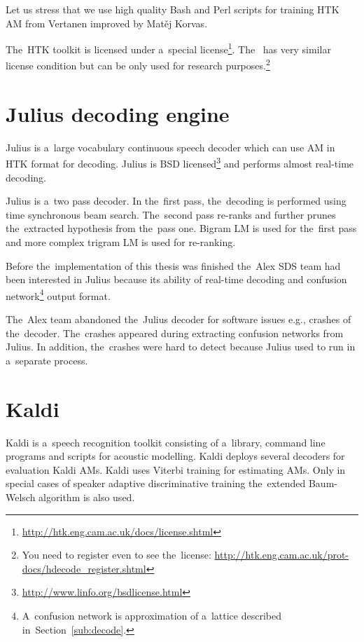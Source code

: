 Let us stress that we use high quality Bash and Perl scripts for training \ac{HTK} \ac{AM} from Vertanen improved by Matěj Korvas.\cite{vertanen_baseline_2006}\cite{korvas_2014}

The~\ac{HTK} toolkit is licensed under a~special license\footnote{\url{http://htk.eng.cam.ac.uk/docs/license.shtml}}.
The~ has very similar license condition but can be only used for research purposes.\footnote{You need to register even to see the~license: \url{http://htk.eng.cam.ac.uk/prot-docs/hdecode_register.shtml}}

\section{Julius decoding engine}
\label{sec:back_julius}

Julius is a~large vocabulary continuous speech decoder which can use \ac{AM} in \ac{HTK} format for decoding.\cite{lee2009julius}
Julius is BSD licensed\footnote{\url{http://www.linfo.org/bsdlicense.html}} and performs almost real-time decoding.

Julius is a~two pass decoder. 
In the~first pass, the~decoding is performed using time synchronous beam search.
The~second pass re-ranks and further prunes the~extracted hypothesis from the~pass one.
Bigram \ac{LM} is used for the~first pass and more complex trigram \ac{LM} is used for re-ranking.

Before the~implementation of this thesis was finished the~Alex \ac{SDS} team had been interested in Julius because its ability of real-time decoding and confusion network\footnote{A~confusion network is approximation of a~lattice described in~Section~\ref{sub:decode}.} output format.

The~Alex team abandoned the~Julius decoder for software issues e.g., crashes of the~decoder. 
The~crashes appeared during extracting confusion networks from Julius. 
In addition, the~crashes were hard to detect because Julius used to run in a~separate process.

\section{Kaldi}
\label{sec:back_kaldi}

Kaldi is a~speech recognition toolkit consisting of a~library, command line programs and scripts for acoustic modelling.
Kaldi deploys several decoders for evaluation Kaldi \acp{AM}.
Kaldi uses Viterbi training for estimating \acp{AM}. 
Only in special cases of speaker adaptive discriminative training the~extended Baum-Welsch algorithm is also used\cite{povey2011kaldi}.

